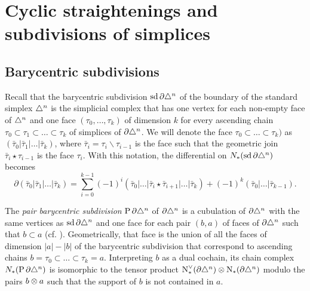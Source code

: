 
\section{Cyclic straightenings and subdivisions of simplices}\label{section:atlast}

\subsection{Barycentric subdivisions}\label{s:assembly}

Recall that the barycentric subdivision $\operatorname{sd} \partial\triangle^n$ of the boundary of the standard simplex $\triangle^n$ is the simplicial complex that has one vertex for each non-empty face of $\triangle^n$ and one face $(\tau_0,\dots,\tau_k)$ of dimension $k$ for every ascending chain $\tau_0 \subset \tau_1\subset\dots \subset \tau_k$ of simplices of $\partial \triangle^n$. We will denote the face $\tau_0 \subset \dots \subset \tau_k)$ as $(\bar{\tau}_0|\bar{\tau}_1|\dots|\bar{\tau}_k)$, where $\bar{\tau}_i = \tau_i\smallsetminus \tau_{i-1}$ is the face such that the geometric join $\bar{\tau}_i\star \tau_{i-1}$ is the face $\tau_i$. With this notation, the differential on $N_{*}(\operatorname{sd} \partial \triangle^n)$ becomes
\[
\partial(\bar{\tau}_0|\bar{\tau}_1|\dots|\bar{\tau}_k) = \sum_{i=0}^{k-1} (-1)^i(\bar{\tau}_0|\dots|\bar{\tau}_i\star \bar{\tau}_{i+1}|\dots |\bar{\tau}_k) + (-1)^k (\bar{\tau}_0|\dots|\bar{\tau}_{k-1}).
\]

The \emph{pair barycentric subdivision} $\operatorname{P} \partial\triangle^n$ of $\partial \triangle^n$ is a cubulation of $\partial \triangle^n$ with the same vertices as $\operatorname{sd} \partial \triangle^n$ and one face for each pair $(b,a)$ of faces of $\partial\triangle^n$ such that $b \subset a$ (cf. \cite{Rounds2010}). Geometrically, that face is the union of all the faces of dimension $|a|-|b|$ of the barycentric subdivision that correspond to ascending chains $b = \tau_0 \subset \dots \subset \tau_k= a$. Interpreting $b$ as a dual cochain, its chain complex $N_{*}(\operatorname{P} \partial\triangle^n)$ is isomorphic to the tensor product $\operatorname{N}^\vee_{*}(\partial\triangle^n) \otimes \operatorname{N}_{*}(\partial\triangle^n)$ modulo the pairs $b \otimes a$ such that the support of $b$ is not contained in $a$.


